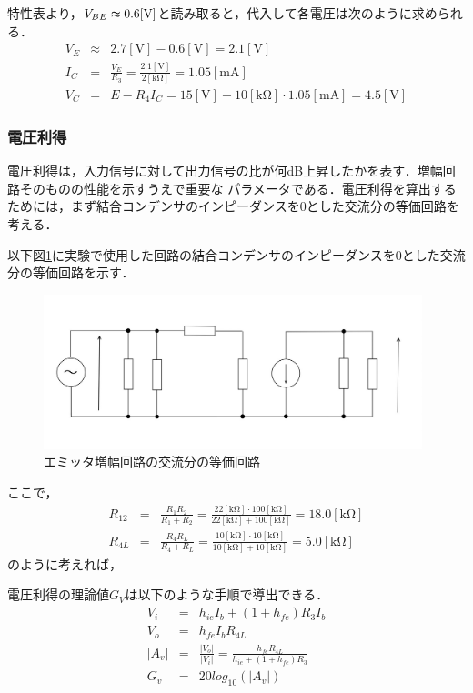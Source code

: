 \documentclass[dvipdfmx,titlepage,a4j]{jsarticle}  %
\numberwithin{equation}{section}
\begin{document}
特性表より，$V_{BE}\thickapprox 0.6 \mathrm{[V]}$と読み取ると，代入して各電圧は次のように求められる．
\begin{eqnarray}
  V_E &\approx& 2.7\mathrm{[V]} - 0.6\mathrm{[V]} = 2.1\mathrm{[V]}\\
  \label{eq:I_C}
  I_C &=& \frac{V_E}{R_3} = \frac{2.1\mathrm{[V]}}{2\mathrm{[k\Omega]}} = 1.05\mathrm{[mA]}\\
  V_C &=& E - R_4 I_C = 15\mathrm{[V]} - 10\mathrm{[k\Omega]} \cdot 1.05\mathrm{[mA]} = 4.5\mathrm{[V]}
\end{eqnarray}

\subsubsection{電圧利得}
電圧利得は，入力信号に対して出力信号の比が何dB上昇したかを表す．増幅回路そのものの性能を示すうえで重要な
パラメータである．電圧利得を算出するためには，まず結合コンデンサのインピーダンスを0とした交流分の等価回路を考える．

以下図\ref{fig:fig3-touka.jpg}に実験で使用した回路の結合コンデンサのインピーダンスを0とした交流分の等価回路を示す．

\begin{figure}[H]
  \centering
  \includegraphics[width=11cm]{../fig/fig3-touka.jpg}
  \caption{エミッタ増幅回路の交流分の等価回路}
  \label{fig:fig3-touka.jpg}
\end{figure}

ここで，
\begin{eqnarray}
  R_{12} &=& \frac{R_1 R_2}{R_1 + R_2} = \frac{22\mathrm{[k\Omega]} \cdot 100\mathrm{[k\Omega]}}{22\mathrm{[k\Omega]} + 100\mathrm{[k\Omega]}} = 18.0\mathrm{[k\Omega]} \\
  R_{4L} &=& \frac{R_4 R_L}{R_4 + R_L}= \frac{10\mathrm{[k\Omega]} \cdot 10\mathrm{[k\Omega]}}{10\mathrm{[k\Omega]} + 10\mathrm{[k\Omega]}} = 5.0\mathrm{[k\Omega]}
\end{eqnarray}
のように考えれば，

電圧利得の理論値$G_V$は以下のような手順で導出できる．
\begin{eqnarray}
  V_i &=& h_{ie} I_b + (1+h_{fe})R_3 I_b \\
  V_o &=& h_{fe} I_b R_{4L} \\
  \left\lvert A_v \right\rvert &=& \frac{\left\lvert V_o \right\rvert}{\left\lvert V_i \right\rvert}
  = \frac{h_{fe} R_{4L}}{h_{ie} + (1+h_{fe})R_3} \\
  G_v &=& 20log_{10}(\left\lvert A_v \right\rvert)
\end{eqnarray}
\end{document}

